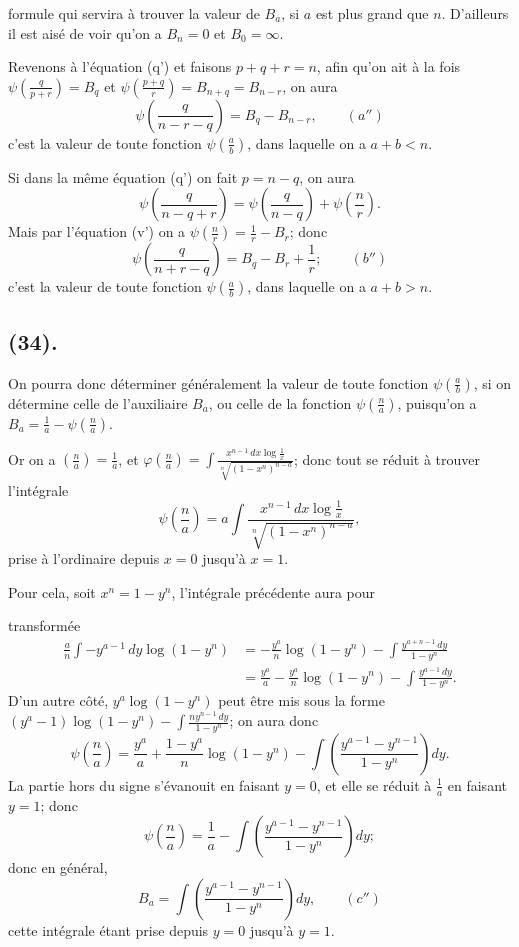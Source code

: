 \documentclass{article}
\begin{document}
formule qui servira à trouver la valeur de $B_{a}$, si $a$ est plus grand que $n$. D'ailleurs il est aisé de voir qu'on a $B_{n}=0$ et $B_{0}=\infty$.

Revenons à l'équation (q') et faisons $p+q+r=n$, afin qu'on ait à la fois $\psi\left(\frac{q}{p+r}\right)=B_{q}$ et $\psi\left(\frac{p+q}{r}\right)=B_{n+q}=B_{n-r}$, on aura
\[ \psi\left(\frac{q}{n-r-q}\right)=B_{q}-B_{n-r},\qquad(a'') \]
c'est la valeur de toute fonction $\psi\left(\frac{a}{b}\right)$, dans laquelle on a $a+b<n$.

Si dans la même équation (q') on fait $p=n-q$, on aura
\[ \psi\left(\frac{q}{n-q+r}\right)=\psi\left(\frac{q}{n-q}\right)+\psi\left(\frac{n}{r}\right). \]
Mais par l'équation (v') on a $\psi\left(\frac{n}{r}\right)=\frac{1}{r}-B_{r}$; donc
\[ \psi\left(\frac{q}{n+r-q}\right)=B_{q}-B_{r}+\frac{1}{r};\qquad(b'') \]
c'est la valeur de toute fonction $\psi\left(\frac{a}{b}\right)$, dans laquelle on a $a+b>n$.

\subsection*{(34).}

On pourra donc déterminer généralement la valeur de toute fonction $\psi\left(\frac{a}{b}\right)$, si on détermine celle de l'auxiliaire $B_{a}$, ou celle de la fonction $\psi\left(\frac{n}{a}\right)$, puisqu'on a $B_{a}=\frac{1}{a}-\psi\left(\frac{n}{a}\right)$.

Or on a $\left(\frac{n}{a}\right)=\frac{1}{a}$, et $\varphi\left(\frac{n}{a}\right)=\displaystyle\int\frac{x^{n-1}\,dx\log\frac{1}{x}}{\sqrt[n]{(1-x^{n})^{n-a}}}$; donc tout se réduit à trouver l'intégrale
\[ \psi\left(\frac{n}{a}\right)=a\int\frac{x^{n-1}\,dx\log\frac{1}{x}}{\sqrt[n]{(1-x^{n})^{n-a}}}, \]
prise à l'ordinaire depuis $x=0$ jusqu'à $x=1$.

Pour cela, soit $x^{n}=1-y^{n}$, l'intégrale précédente aura pour

transformée
\[ \begin{aligned} \frac{a}{n}\int-y^{a-1}\,dy\log(1-y^{n})&=-\frac{y^{a}}{n}\log(1-y^{n})-\int\frac{y^{a+n-1}\,dy}{1-y^{n}}\\ &=\frac{y^{a}}{a}-\frac{y^{a}}{n}\log(1-y^{n})-\int\frac{y^{a-1}\,dy}{1-y^{n}}. \end{aligned} \]
D'un autre côté, $y^{a}\log(1-y^{n})$ peut être mis sous la forme $(y^{a}-1)\log(1-y^{n})-\displaystyle\int\frac{ny^{n-1}\,dy}{1-y^{n}}$; on aura donc
\[ \psi\left(\frac{n}{a}\right)=\frac{y^{a}}{a}+\frac{1-y^{a}}{n}\log(1-y^{n})-\int\left(\frac{y^{a-1}-y^{n-1}}{1-y^{n}}\right)dy. \]
La partie hors du signe s'évanouit en faisant $y=0$, et elle se réduit à $\frac{1}{a}$ en faisant $y=1$; donc
\[ \psi\left(\frac{n}{a}\right)=\frac{1}{a}-\int\left(\frac{y^{a-1}-y^{n-1}}{1-y^{n}}\right)dy; \]
donc en général,
\[ B_{a}=\int\left(\frac{y^{a-1}-y^{n-1}}{1-y^{n}}\right)dy,\qquad(c'') \]
cette intégrale étant prise depuis $y=0$ jusqu'à $y=1$.
\end{document}
